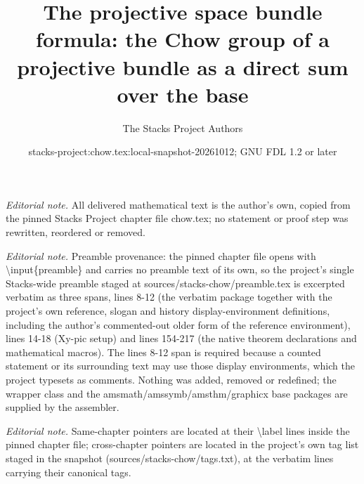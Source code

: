 \documentclass[10pt,a4paper]{amsart}
\title{The projective space bundle formula: the Chow group of a projective bundle as a direct sum over the base}
\author{The Stacks Project Authors}
\date{stacks-project:chow.tex:local-snapshot-20261012; GNU FDL 1.2 or later}
\theoremstyle{plain}
\theoremstyle{definition}
\theoremstyle{remark}
\numberwithin{equation}{subsection}
\begin{document}
\maketitle
\noindent\textit{Editorial note.} All delivered mathematical text is the author's own, copied from the pinned Stacks Project chapter file chow.tex; no statement or proof step was rewritten, reordered or removed.\par\medskip
\noindent\textit{Editorial note.} Preamble provenance: the pinned chapter file opens with \textbackslash{}input\{preamble\} and carries no preamble text of its own, so the project's single Stacks-wide preamble staged at sources/stacks-chow/preamble.tex is excerpted verbatim as three spans, lines 8-12 (the verbatim package together with the project's own reference, slogan and history display-environment definitions, including the author's commented-out older form of the reference environment), lines 14-18 (Xy-pic setup) and lines 154-217 (the native theorem declarations and mathematical macros). The lines 8-12 span is required because a counted statement or its surrounding text may use those display environments, which the project typesets as comments. Nothing was added, removed or redefined; the wrapper class and the amsmath/amssymb/amsthm/graphicx base packages are supplied by the assembler.\par\medskip
\noindent\textit{Editorial note.} Same-chapter pointers are located at their \textbackslash{}label lines inside the pinned chapter file; cross-chapter pointers are located in the project's own tag list staged in the snapshot (sources/stacks-chow/tags.txt), at the verbatim lines carrying their canonical tags.\par\medskip
\end{document}
